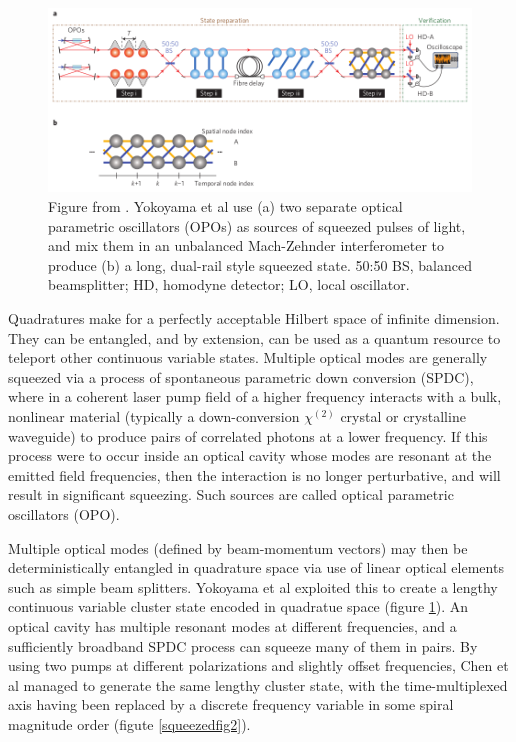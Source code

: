 \documentclass[twocolumn]{Styles/IEEEtran11}
\begin{document}
\begin{figure}[t]
  \centering
  \includegraphics[width=\linewidth]{Images/squeezed01.png}
  \caption{Figure from \protect\cite{furusawa2013}. Yokoyama et al use (a) two separate optical parametric oscillators (OPOs) as sources of squeezed pulses of light, and mix them in an unbalanced Mach-Zehnder interferometer to produce (b) a long, dual-rail style squeezed state. 50:50 BS, balanced beamsplitter; HD, homodyne detector; LO, local oscillator.}
  \label{squeezedfig1}
\end{figure}

Quadratures make for a perfectly acceptable Hilbert space of infinite dimension. They can be entangled, and by extension, can be used as a quantum resource to teleport other continuous variable states. Multiple optical modes are generally squeezed via a process of spontaneous parametric down conversion (SPDC), where in a coherent laser pump field of a higher frequency interacts with a bulk, nonlinear material (typically a down-conversion $\chi^{(2)}$ crystal or crystalline waveguide) to produce pairs of correlated photons at a lower frequency. If this process were to occur inside an optical cavity whose modes are resonant at the emitted field frequencies, then the interaction is no longer perturbative, and will result in significant squeezing. Such sources are called optical parametric oscillators (OPO).

Multiple optical modes (defined by beam-momentum vectors) may then be deterministically entangled in quadrature space via use of linear optical elements such as simple beam splitters. Yokoyama et al \cite{furusawa2013} exploited this to create a lengthy continuous variable cluster state encoded in quadratue space (figure \ref{squeezedfig1}). An optical cavity has multiple resonant modes at different frequencies, and a sufficiently broadband SPDC process can squeeze many of them in pairs. By using two pumps at different polarizations and slightly offset frequencies, Chen et al \cite{pfister2014} managed to generate the same lengthy cluster state, with the time-multiplexed axis having been replaced by a discrete frequency variable in some spiral magnitude order (figute \ref{squeezedfig2}).
\end{document}
